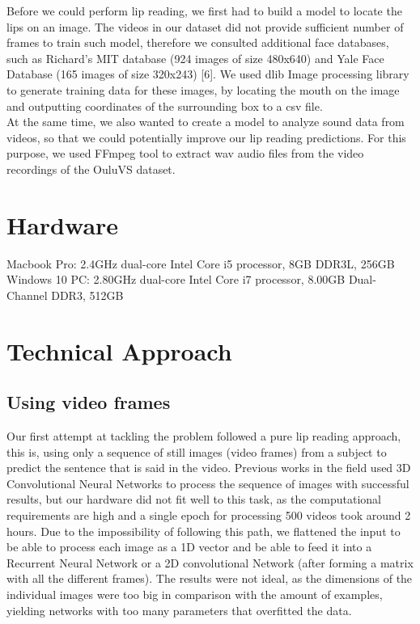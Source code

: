 \documentclass{article}[10pt]
\begin{document}
\begin{multicols}{2}
Before we could perform lip reading, we first had to build a model to locate the
lips on an image. The videos in our dataset did not provide sufficient number of
frames to train such model, therefore we consulted additional face databases, such
as Richard's MIT database (924 images of size 480x640) and Yale Face Database
(165 images of size 320x243) [6]. We used dlib Image processing library to
generate training data for these images, by locating the mouth on the image and
outputting coordinates of the surrounding box to a csv file.\\

At the same time, we also wanted to create a model to analyze sound data from
videos, so that we could potentially improve our lip reading predictions. For
this purpose, we used FFmpeg tool to extract wav audio files from the video
recordings of the OuluVS dataset.

\section{Hardware}
Macbook Pro: 2.4GHz dual-core Intel Core i5 processor, 8GB DDR3L, 256GB
Windows 10 PC: 2.80GHz dual-core Intel Core i7 processor, 8.00GB Dual-Channel DDR3, 512GB

\section{Technical Approach}
\subsection{Using video frames}

Our first attempt at tackling the problem followed a pure lip reading approach,
this is, using only a sequence of still images (video frames) from a subject to
predict the sentence that is said in the video. Previous works in the field used
3D Convolutional Neural Networks to process the sequence of images with
successful results, but our hardware did not fit well to this task, as the
computational requirements are high and a single epoch for
processing 500 videos took around 2 hours. Due to the impossibility of following this path, we
flattened the input to be able to process each image as a 1D vector and be able
to feed it into a Recurrent Neural Network or a 2D convolutional Network
(after forming a matrix with all the different frames). The results were not
ideal, as the dimensions of the individual images were too big in comparison with
the amount of examples, yielding networks with too many parameters that
overfitted the data.


\end{multicols}
\end{document}
